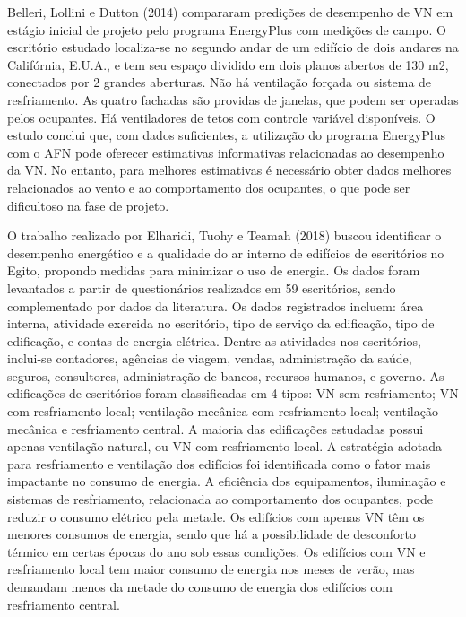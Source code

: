 \documentclass[brazil,hardcopy,openany,a5paper]{ufscthesis}
\begin{document}
	Belleri, Lollini e Dutton (2014) compararam predições de desempenho de VN em estágio inicial de projeto pelo programa EnergyPlus com medições de campo. O escritório estudado localiza-se no segundo andar de um edifício de dois andares na Califórnia, E.U.A., e tem seu espaço dividido em dois planos abertos de 130 m2, conectados por 2 grandes aberturas. Não há ventilação forçada ou sistema de resfriamento. As quatro fachadas são providas de janelas, que podem ser operadas pelos ocupantes. Há ventiladores de tetos com controle variável disponíveis. O estudo conclui que, com dados suficientes, a utilização do programa EnergyPlus com o AFN pode oferecer  estimativas informativas relacionadas ao desempenho da VN. No entanto, para melhores estimativas é necessário obter dados melhores relacionados ao vento e ao comportamento dos ocupantes, o que pode ser dificultoso na fase de projeto.

	O trabalho realizado por Elharidi, Tuohy e Teamah (2018) buscou identificar o desempenho energético e a qualidade do ar interno de edifícios de escritórios no Egito, propondo medidas para minimizar o uso de energia. Os dados foram levantados a partir de questionários realizados em 59 escritórios, sendo complementado por dados da literatura. Os dados registrados incluem: área interna, atividade exercida no escritório, tipo de serviço da edificação, tipo de edificação, e contas de energia elétrica. Dentre as atividades nos escritórios, inclui-se contadores, agências de viagem, vendas, administração da saúde, seguros, consultores, administração de bancos, recursos humanos, e governo. As edificações de escritórios foram classificadas em 4 tipos: VN sem resfriamento; VN com resfriamento local; ventilação mecânica com resfriamento local; ventilação mecânica e resfriamento central. A maioria das edificações estudadas possui apenas ventilação natural, ou VN com resfriamento local. A estratégia adotada para resfriamento e ventilação dos edifícios foi identificada como o fator mais impactante no consumo de energia. A eficiência dos equipamentos, iluminação e sistemas de resfriamento, relacionada ao comportamento dos ocupantes, pode reduzir o consumo elétrico pela metade. Os edifícios com apenas VN têm os menores consumos de energia, sendo que há a possibilidade de desconforto térmico em certas épocas do ano sob essas condições. Os edifícios com VN e resfriamento local tem maior consumo de energia nos meses de verão, mas demandam menos da metade do consumo de energia dos edifícios com resfriamento central.
	
\end{document}
